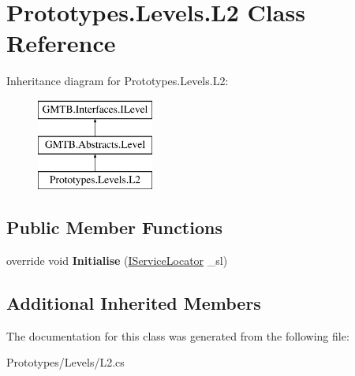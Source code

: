 \hypertarget{class_prototypes_1_1_levels_1_1_l2}{}\section{Prototypes.\+Levels.\+L2 Class Reference}
\label{class_prototypes_1_1_levels_1_1_l2}
Inheritance diagram for Prototypes.\+Levels.\+L2\+:\begin{figure}[H]
\begin{center}
\leavevmode
\includegraphics[height=3.000000cm]{class_prototypes_1_1_levels_1_1_l2}
\end{center}
\end{figure}
\subsection*{Public Member Functions}
\begin{DoxyCompactItemize}
\item 
\mbox{\label{class_prototypes_1_1_levels_1_1_l2_a44a8b18b374ec89d0970e13b5da57806}} 
override void {\bfseries Initialise} (\mbox{\hyperlink{interface_g_m_t_b_1_1_interfaces_1_1_i_service_locator}{I\+Service\+Locator}} \+\_\+sl)
\end{DoxyCompactItemize}
\subsection*{Additional Inherited Members}


The documentation for this class was generated from the following file\+:\begin{DoxyCompactItemize}
\item 
Prototypes/\+Levels/L2.\+cs\end{DoxyCompactItemize}

